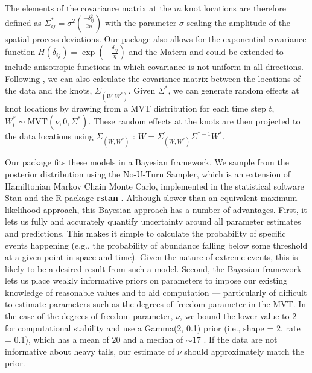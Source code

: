 \documentclass[12pt,english]{article}
\begin{document}
\begin{spacing}{1.5}
The elements of the covariance matrix at the $m$ knot locations are therefore
defined as $\Sigma_{ij}^*=\sigma^2 \left( \frac{-\delta_{ij}^2}{2 \eta}  \right)$ with the
parameter $\sigma$ scaling the amplitude of the spatial process deviations. Our
package also allows for the exponential covariance function $H(\delta_{ij}) =
\exp \left(-\frac{\delta_{ij} }{\eta} \right)$ and the Matern and could be
extended to include anisotropic 
functions in which covariance is not uniform in all directions.
Following \citet{latimer2009}, we can also calculate the covariance matrix
between the locations of the data and the knots,
$\Sigma_{\left(W, W^* \right)}$.
Given $\Sigma^*$, we can generate random effects at knot
locations by drawing from a MVT distribution for each time step $t$,
$W_t^*\sim \mathrm{MVT}\left( \nu, 0, \Sigma^{*} \right)$.
These random effects at the knots are then projected to the data locations using
$\Sigma_{\left( W,W^{*} \right)}$ \citep{latimer2009}:
$W=\Sigma_{\left(W,W^* \right)}^{'} \Sigma^{*-1}W^*$.

Our package fits these models in a Bayesian framework. We sample
from the posterior distribution using the No-U-Turn Sampler, which is an
extension of Hamiltonian Markov Chain Monte Carlo, implemented in the
statistical software Stan \citep{standevelopmentteam2016a, carpenter2017}
and the R package \textbf{rstan} \citep{standevelopmentteam2016}. Although slower
than an equivalent maximum likelihood approach, this Bayesian approach has a
number of advantages. First, it lets us fully and accurately quantify
uncertainty around all parameter estimates and predictions. This makes it
simple to calculate the probability of specific events happening (e.g., the
probability of abundance falling below some threshold at a given point in space
and time). Given the nature of extreme events, this is likely to be a desired
result from such a model. Second, the Bayesian framework lets us place weakly
informative priors on parameters to impose our existing knowledge of reasonable
values and to aid computation --- particularly of difficult to estimate
parameters such as the degrees of freedom parameter in the MVT. In the case of
the degrees of freedom parameter, $\nu$, we bound the lower value to $2$ for
computational stability and use a Gamma(2, 0.1) prior (i.e., shape = 2, rate = 0.1),
which has a mean of $20$ and a median of $\sim 17$ \citep{juarez2010}.
If the data are not informative about heavy
tails, our estimate of $\nu$ should approximately match the prior.


\end{spacing}
\end{document}
